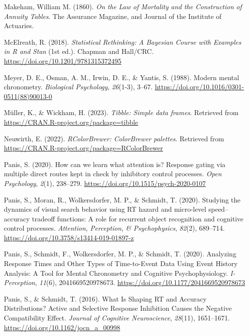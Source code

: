 \documentclass[
  man, donotrepeattitle,floatsintext]{apa6}
\newlength{\cslhangindent}
\newenvironment{CSLReferences}[2] %
 {\begin{list}{}{%
  \setlength{\itemindent}{0pt}
  \setlength{\leftmargin}{0pt}
  \setlength{\parsep}{0pt}
  \ifodd #1
   \setlength{\leftmargin}{\cslhangindent}
   \setlength{\itemindent}{-1\cslhangindent}
  \fi
  \setlength{\itemsep}{#2\baselineskip}}}
 {\end{list}}
\begin{document}
\begin{CSLReferences}{1}{0}
Makeham, William M. (1860). \emph{On the {Law} of {Mortality} and the {Construction} of {Annuity Tables}}. {The Assurance Magazine, and Journal of the Institute of Actuaries}.

McElreath, R. (2018). \emph{Statistical {Rethinking}: {A Bayesian Course} with {Examples} in {R} and {Stan}} (1st ed.). {Chapman and Hall/CRC}. \url{https://doi.org/10.1201/9781315372495}

Meyer, D. E., Osman, A. M., Irwin, D. E., \& Yantis, S. (1988). Modern mental chronometry. \emph{Biological Psychology}, \emph{26}(1-3), 3--67. \url{https://doi.org/10.1016/0301-0511(88)90013-0}

Müller, K., \& Wickham, H. (2023). \emph{Tibble: Simple data frames}. Retrieved from \url{https://CRAN.R-project.org/package=tibble}

Neuwirth, E. (2022). \emph{RColorBrewer: ColorBrewer palettes}. Retrieved from \url{https://CRAN.R-project.org/package=RColorBrewer}

Panis, S. (2020). How can we learn what attention is? {Response} gating via multiple direct routes kept in check by inhibitory control processes. \emph{Open Psychology}, \emph{2}(1), 238--279. \url{https://doi.org/10.1515/psych-2020-0107}

Panis, S., Moran, R., Wolkersdorfer, M. P., \& Schmidt, T. (2020). Studying the dynamics of visual search behavior using {RT} hazard and micro-level speed--accuracy tradeoff functions: {A} role for recurrent object recognition and cognitive control processes. \emph{Attention, Perception, \& Psychophysics}, \emph{82}(2), 689--714. \url{https://doi.org/10.3758/s13414-019-01897-z}

Panis, S., Schmidt, F., Wolkersdorfer, M. P., \& Schmidt, T. (2020). Analyzing {Response Times} and {Other Types} of {Time-to-Event Data Using Event History Analysis}: {A Tool} for {Mental Chronometry} and {Cognitive Psychophysiology}. \emph{I-Perception}, \emph{11}(6), 2041669520978673. \url{https://doi.org/10.1177/2041669520978673}

Panis, S., \& Schmidt, T. (2016). What {Is Shaping RT} and {Accuracy Distributions}? {Active} and {Selective Response Inhibition Causes} the {Negative Compatibility Effect}. \emph{Journal of Cognitive Neuroscience}, \emph{28}(11), 1651--1671. \url{https://doi.org/10.1162/jocn_a_00998}


\end{CSLReferences}
\end{document}
